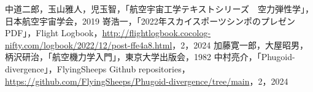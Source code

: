 \documentclass{jarticle}
\begin{document}
\begin{thebibliography}{99}
     中道二郎，玉山雅人，児玉智，「航空宇宙工学テキストシリーズ　空力弾性学」，日本航空宇宙学会，2019
     嵜浩一，「2022年スカイスポーツシンポのプレゼンPDF」，Flight Logbook，\url{http://flightlogbook.cocolog-nifty.com/logbook/2022/12/post-ffe4a8.html}，2，2024
     加藤寛一郎，大屋昭男，柄沢研治，「航空機力学入門」，東京大学出版会，1982
     中村亮介，「Phugoid-divergence」，FlyingSheeps Github repositories，\url{https://github.com/FlyingSheeps/Phugoid-divergence/tree/main}，2，2024
\end{thebibliography}
\end{document}
